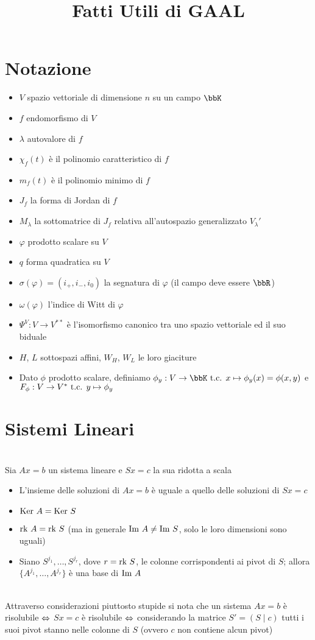 \documentclass[a4paper,NoNotes,GeneralMath]{stdmdoc}
\begin{document}
	\title{Fatti Utili di GAAL}
	\autodate

	\section*{Notazione}
	\begin{itemize}
		\item $V$ spazio vettoriale di dimensione $n$ su un campo $\bbK$
		\item $f$ endomorfismo di $V$
		\item $\lambda$ autovalore di $f$
		\item $\chi_f(t)$ è il polinomio caratteristico di $f$
		\item $m_f(t)$ è il polinomio minimo di $f$
		\item $J_f$ la forma di Jordan di $f$
		\item $M_\lambda$ la sottomatrice di $J_f$ relativa all'autospazio generalizzato $V_\lambda'$
		\item $\varphi$ prodotto scalare su $V$
		\item $q$ forma quadratica su $V$
		\item $\sigma(\varphi) = (i_{+}, i_{-}, i_0)$ la segnatura di $\varphi$ (il campo deve essere $\bbR$)
		\item $\omega(\varphi)$ l'indice di Witt di $\varphi$
		\item $\Psi^{V} : V \rightarrow V^{**}$ è l'isomorfismo canonico tra uno spazio vettoriale ed il suo biduale
		\item $H$, $L$ sottospazi affini, $W_H$, $W_L$ le loro giaciture
		\item Dato $\phi$ prodotto scalare, definiamo $\phi_y: V \rightarrow \bbK \tc x \mapsto \phi_y(x) = \phi(x,y)$ e $F_\phi: V \rightarrow V^{*} \mbox{ t.c. } y \mapsto \phi_y$
	\end{itemize}
	
	\section*{Sistemi Lineari}
	 \\
	Sia $Ax = b$ un sistema lineare e $Sx = c$ la sua ridotta a scala
	\begin{itemize}
		\item L'insieme delle soluzioni di $Ax = b$ è uguale a quello delle soluzioni di $Sx = c$
		\item $\mbox{Ker } A = \mbox{Ker } S$
		\item $\mbox{rk } A = \mbox{rk } S$ (ma in generale $\mbox{Im } A \neq \mbox{Im } S$, solo le loro dimensioni sono uguali)
		\item Siano $S^{j_1}, \ldots, S^{j_r}$, dove $r = \mbox{rk } S$, le colonne corrispondenti ai pivot di $S$; allora $\{A^{j_1}, \ldots, A^{j_r}\}$ è una base di $\mbox{Im } A$
	\end{itemize}
	 \\
	Attraverso considerazioni piuttosto stupide si nota che un sistema $Ax = b$ è risolubile $\Leftrightarrow$ $Sx = c$ è risolubile $\Leftrightarrow$ considerando la matrice $S' = \left( S \mid c \right)$ tutti i suoi pivot stanno nelle colonne di $S$ (ovvero $c$ non contiene alcun pivot)
\end{document}
